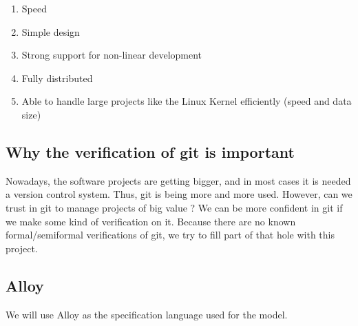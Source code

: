 \begin{enumerate}
	\item Speed
	\item Simple design
	\item Strong support for non-linear development
	\item Fully distributed
	\item Able to handle large projects like the Linux Kernel 
	efficiently (speed and data size)
\end{enumerate}

\subsection{Why the verification of git is important}

Nowadays, the software projects are getting bigger, and in most
cases it is needed a version control system. Thus, git is being
more and more used. However, can we trust in git to manage projects
of big value ? We can be
more confident in git if we make some kind of verification on it. Because
there are no known formal/semiformal verifications of git, we try to fill
part of that hole with this project.

\subsection{Alloy}
We will use Alloy as the specification language used for the model.
